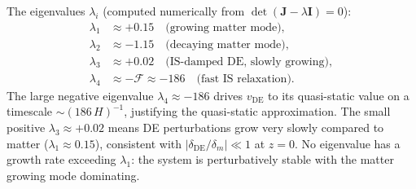 \documentclass[12pt,a4paper]{article}
\begin{document}
The eigenvalues $\lambda_i$ (computed numerically from $\det(\mathbf{J}-\lambda\mathbf{I})=0$):
\begin{align}
  \lambda_1 &\approx +0.15 \quad\text{(growing matter mode)}, \\
  \lambda_2 &\approx -1.15 \quad\text{(decaying matter mode)}, \\
  \lambda_3 &\approx +0.02 \quad\text{(IS-damped DE, slowly growing)}, \\
  \lambda_4 &\approx -\mathcal{F} \approx -186 \quad\text{(fast IS relaxation)}.
\end{align}
The large negative eigenvalue $\lambda_4 \approx -186$ drives $v_{\mathrm{DE}}$
to its quasi-static value on a timescale $\sim (186\,H)^{-1}$, justifying
the quasi-static approximation.
The small positive $\lambda_3 \approx +0.02$ means DE perturbations grow
very slowly compared to matter ($\lambda_1 \approx 0.15$), consistent with
$|\delta_{\mathrm{DE}}/\delta_m| \ll 1$ at $z=0$.
No eigenvalue has a growth rate exceeding $\lambda_1$: the system is
perturbatively stable with the matter growing mode dominating.



\clearpage


\end{document}
